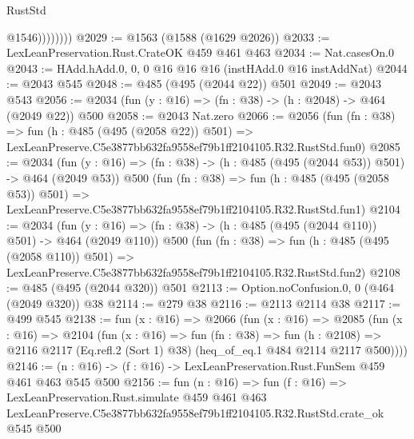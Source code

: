 \begin{lexlean}{RustStd}
\begin{coremodule}
                    @1546))))))))
@2029 := @1563 (@1588 (@1629 @2026))
@2033 := LexLeanPreservation.Rust.CrateOK @459 @461 @463
@2034 := Nat.casesOn.{0}
@2043 := HAdd.hAdd.{0, 0, 0} @16 @16 @16 (instHAdd.{0} @16 instAddNat)
@2044 := @2043 @545
@2048 := @485 (@495 (@2044 @22)) @501
@2049 := @2043 @543
@2056 := @2034 (fun (y : @16) => (fn : @38) -> (h : @2048) -> @464 (@2049 @22)) @500
@2058 := @2043 Nat.zero
@2066 := @2056
    (fun (fn : @38) =>
    fun (h : @485 (@495 (@2058 @22)) @501) =>
    LexLeanPreserve.C5e3877bb632fa9558ef79b1ff2104105.R32.RustStd.fun0)
@2085 := @2034
    (fun (y : @16) => (fn : @38) -> (h : @485 (@495 (@2044 @53)) @501) -> @464 (@2049 @53))
    @500
    (fun (fn : @38) =>
    fun (h : @485 (@495 (@2058 @53)) @501) =>
    LexLeanPreserve.C5e3877bb632fa9558ef79b1ff2104105.R32.RustStd.fun1)
@2104 := @2034
    (fun (y : @16) => (fn : @38) -> (h : @485 (@495 (@2044 @110)) @501) -> @464 (@2049 @110))
    @500
    (fun (fn : @38) =>
    fun (h : @485 (@495 (@2058 @110)) @501) =>
    LexLeanPreserve.C5e3877bb632fa9558ef79b1ff2104105.R32.RustStd.fun2)
@2108 := @485 (@495 (@2044 @320)) @501
@2113 := Option.noConfusion.{0, 0} (@464 (@2049 @320)) @38
@2114 := @279 @38
@2116 := @2113 @2114 @38
@2117 := @499 @545
@2138 := fun (x : @16) =>
  @2066
    (fun (x : @16) =>
    @2085
      (fun (x : @16) =>
      @2104
        (fun (x : @16) =>
        fun (fn : @38) =>
        fun (h : @2108) =>
        @2116 @2117 (Eq.refl.{2} (Sort 1) @38) (heq_of_eq.{1} @484 @2114 @2117 @500))))
@2146 := (n : @16) -> (f : @16) -> LexLeanPreservation.Rust.FunSem @459 @461 @463 @545 @500
@2156 := fun (n : @16) =>
  fun (f : @16) =>
  LexLeanPreservation.Rust.simulate
    @459
    @461
    @463
    LexLeanPreserve.C5e3877bb632fa9558ef79b1ff2104105.R32.RustStd.crate_ok
    @545
    @500
\end{coremodule}
\end{lexlean}
